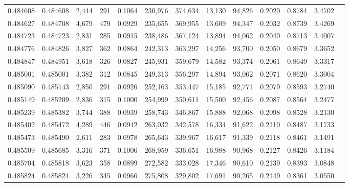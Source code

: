 \begin{tabular}{rrrrrrrrrrrrr}
0.484608 & 0.484608 &  2,444 &   291 &                                     0.1064 & 230,976 & 374,634 &  13,130 &  94,826 & 0.2020 & 0.8784 & 3.4702 \\
0.484627 & 0.484708 &  4,679 &   479 &                                     0.0929 & 235,655 & 369,955 &  13,609 &  94,347 & 0.2032 & 0.8739 & 3.4269 \\
0.484723 & 0.484723 &  2,831 &   285 &                                     0.0915 & 238,486 & 367,124 &  13,894 &  94,062 & 0.2040 & 0.8713 & 3.4007 \\
0.484776 & 0.484826 &  3,827 &   362 &                                     0.0864 & 242,313 & 363,297 &  14,256 &  93,700 & 0.2050 & 0.8679 & 3.3652 \\
0.484847 & 0.484951 &  3,618 &   326 &                                     0.0827 & 245,931 & 359,679 &  14,582 &  93,374 & 0.2061 & 0.8649 & 3.3317 \\
0.485001 & 0.485001 &  3,382 &   312 &                                     0.0845 & 249,313 & 356,297 &  14,894 &  93,062 & 0.2071 & 0.8620 & 3.3004 \\
0.485090 & 0.485143 &  2,850 &   291 &                                     0.0926 & 252,163 & 353,447 &  15,185 &  92,771 & 0.2079 & 0.8593 & 3.2740 \\
0.485149 & 0.485209 &  2,836 &   315 &                                     0.1000 & 254,999 & 350,611 &  15,500 &  92,456 & 0.2087 & 0.8564 & 3.2477 \\
0.485239 & 0.485382 &  3,744 &   388 &                                     0.0939 & 258,743 & 346,867 &  15,888 &  92,068 & 0.2098 & 0.8528 & 3.2130 \\
0.485402 & 0.485472 &  4,289 &   446 &                                     0.0942 & 263,032 & 342,578 &  16,334 &  91,622 & 0.2110 & 0.8487 & 3.1733 \\
0.485473 & 0.485490 &  2,611 &   283 &                                     0.0978 & 265,643 & 339,967 &  16,617 &  91,339 & 0.2118 & 0.8461 & 3.1491 \\
0.485509 & 0.485685 &  3,316 &   371 &                                     0.1006 & 268,959 & 336,651 &  16,988 &  90,968 & 0.2127 & 0.8426 & 3.1184 \\
0.485704 & 0.485818 &  3,623 &   358 &                                     0.0899 & 272,582 & 333,028 &  17,346 &  90,610 & 0.2139 & 0.8393 & 3.0848 \\
0.485824 & 0.485824 &  3,226 &   345 &                                     0.0966 & 275,808 & 329,802 &  17,691 &  90,265 & 0.2149 & 0.8361 & 3.0550 \\

\end{tabular}
